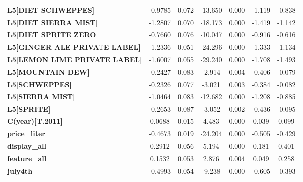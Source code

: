\begin{center}
\begin{tabular}{lcccccc}
\textbf{L5[DIET SCHWEPPES]}                &      -0.9785  &        0.072     &   -13.650  &         0.000        &       -1.119    &       -0.838     \\
\textbf{L5[DIET SIERRA MIST]}              &      -1.2807  &        0.070     &   -18.173  &         0.000        &       -1.419    &       -1.142     \\
\textbf{L5[DIET SPRITE ZERO]}              &      -0.7660  &        0.076     &   -10.047  &         0.000        &       -0.916    &       -0.616     \\
\textbf{L5[GINGER ALE PRIVATE LABEL]}      &      -1.2336  &        0.051     &   -24.296  &         0.000        &       -1.333    &       -1.134     \\
\textbf{L5[LEMON LIME PRIVATE LABEL]}      &      -1.6007  &        0.055     &   -29.240  &         0.000        &       -1.708    &       -1.493     \\
\textbf{L5[MOUNTAIN DEW]}                  &      -0.2427  &        0.083     &    -2.914  &         0.004        &       -0.406    &       -0.079     \\
\textbf{L5[SCHWEPPES]}                     &      -0.2326  &        0.077     &    -3.021  &         0.003        &       -0.384    &       -0.082     \\
\textbf{L5[SIERRA MIST]}                   &      -1.0464  &        0.083     &   -12.682  &         0.000        &       -1.208    &       -0.885     \\
\textbf{L5[SPRITE]}                        &      -0.2653  &        0.087     &    -3.052  &         0.002        &       -0.436    &       -0.095     \\
\textbf{C(year)[T.2011]}                   &       0.0688  &        0.015     &     4.483  &         0.000        &        0.039    &        0.099     \\
\textbf{price\_liter}                      &      -0.4673  &        0.019     &   -24.204  &         0.000        &       -0.505    &       -0.429     \\
\textbf{display\_all}                      &       0.2912  &        0.056     &     5.194  &         0.000        &        0.181    &        0.401     \\
\textbf{feature\_all}                      &       0.1532  &        0.053     &     2.876  &         0.004        &        0.049    &        0.258     \\
\textbf{july4th}                           &      -0.4993  &        0.054     &    -9.238  &         0.000        &       -0.605    &       -0.393     \\

\end{tabular}
\end{center}
